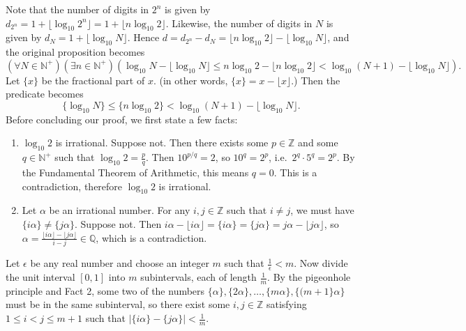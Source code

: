 \documentclass{article}
\begin{document}
    Note that the number of digits in $2^{n}$ is given by $d_{2^{n}} = 1 + \lfloor \log_{10}2^{n} \rfloor = 1 + \lfloor n\log_{10}2 \rfloor$. Likewise, the number of digits in $N$ is given by $d_{N} = 1 + \lfloor \log_{10}N \rfloor$. Hence $d = d_{2^{n}} - d_{N} = \lfloor n\log_{10}2 \rfloor - \lfloor \log_{10}N \rfloor$, and the original proposition becomes $$(\forall N \in \mathbb{N}^{+})(\exists n \in \mathbb{N}^{+}) (\log_{10}N - \lfloor \log_{10}N \rfloor \le n \log_{10}2 - \lfloor n\log_{10}2 \rfloor  < \log_{10}(N + 1) - \lfloor \log_{10}N \rfloor).$$ Let $\{x\}$ be the fractional part of $x$. (in other words, $\{x\} = x - \lfloor x \rfloor$.) Then the predicate becomes 
    \begin{equation}
        \{\log_{10}N\} \le \{n \log_{10}2\} < \log_{10}(N + 1) - \lfloor \log_{10}N \rfloor.
    \end{equation}
    Before concluding our proof, we first state a few facts:
    \begin{enumerate}[label = Fact \arabic*:, leftmargin = *]
        \item $\log_{10} 2$ is irrational. Suppose not. Then there exists some $p \in \mathbb{Z}$ and some $q \in \mathbb{N^{+}}$ such that $\log_{10}2 = \frac{p}{q}$. Then $10^{p/q} = 2$, so $10^{q} = 2^{p}$, i.e.\ $2^{q} \cdot 5^{q} = 2^{p}$. By the Fundamental Theorem of Arithmetic, this means $q = 0$. This is a contradiction, therefore $\log_{10}2$ is irrational.
        \item  Let $\alpha$ be an irrational number. For any $i, j \in \mathbb{Z}$ such that $i \ne j$, we must have $\{i\alpha\} \ne \{j\alpha\}$. Suppose not. Then $i\alpha - \lfloor i\alpha \rfloor =  \{i\alpha\} = \{j\alpha\} = j\alpha - \lfloor j\alpha \rfloor$, so $\alpha = \frac{\lfloor i\alpha \rfloor - \lfloor j\alpha \rfloor}{i- j} \in \mathbb{Q}$, which is a contradiction.
    \end{enumerate}
    Let $\epsilon$ be any real number and choose an integer $m$ such that $\frac{1}{\epsilon} < m$. Now divide the unit interval $[0, 1]$ into $m$ subintervals, each of length $\frac{1}{m}$. By the pigeonhole principle and Fact 2, some two of the numbers $\{\alpha\}, \{2\alpha\}, \dots, \{m\alpha\}, \{(m + 1\}\alpha\}$ must be in the same subinterval, so there exist some $i, j \in \mathbb{Z}$ satisfying $1 \le i < j \le m + 1$ such that $|\{i\alpha\} - \{j\alpha\}| < \frac{1}{m}$. 
    
\end{document}
